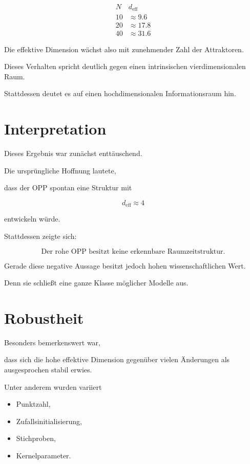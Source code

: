 \[
\begin{array}{c|c}
N & d_{\mathrm{eff}}\\
\hline
10 & \approx 9.6\\
20 & \approx17.8\\
40 & \approx31.6
\end{array}
\]

Die effektive Dimension wächst also mit zunehmender Zahl der Attraktoren.

Dieses Verhalten spricht deutlich gegen einen intrinsischen vierdimensionalen Raum.

Stattdessen deutet es auf einen hochdimensionalen Informationsraum hin.


\section*{Interpretation}

Dieses Ergebnis war zunächst enttäuschend.

Die ursprüngliche Hoffnung lautete,

dass der OPP spontan eine Struktur mit

\[
d_{\mathrm{eff}}
\approx
4
\]

entwickeln würde.

Stattdessen zeigte sich:

\[
\boxed{
\text{Der rohe OPP besitzt keine erkennbare Raumzeitstruktur.}
}
\]

Gerade diese negative Aussage besitzt jedoch hohen wissenschaftlichen Wert.

Denn sie schließt eine ganze Klasse möglicher Modelle aus.


\section*{Robustheit}

Besonders bemerkenswert war,

dass sich die hohe effektive Dimension gegenüber vielen Änderungen als ausgesprochen stabil erwies.

Unter anderem wurden variiert

\begin{itemize}

\item Punktzahl,

\item Zufallsinitialisierung,

\item Stichproben,

\item Kernelparameter.

\end{itemize}

